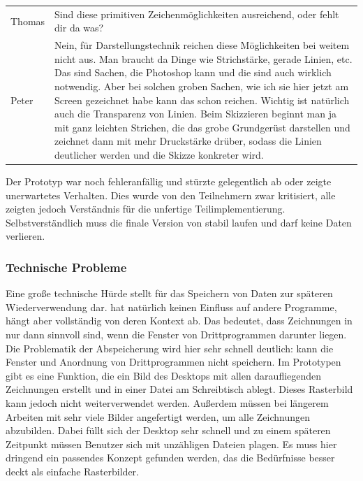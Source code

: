 \begin{extract}[Die Einsatzmöglichkeiten sind begrenzt.]
	{
		\myfloatalign
		\begin{tabularx}{\textwidth}{p{1.5cm}X}
			Thomas & Sind diese primitiven Zeichenmöglichkeiten ausreichend, oder fehlt dir da was?\\
			Peter & Nein, für Darstellungstechnik reichen diese Möglichkeiten bei weitem nicht aus. Man braucht da Dinge wie Strichstärke, gerade Linien, etc. Das sind Sachen, die Photoshop kann und die sind auch wirklich notwendig. Aber bei solchen groben Sachen, wie ich sie hier jetzt am Screen gezeichnet habe kann das schon reichen. Wichtig ist natürlich auch die Transparenz von Linien. Beim Skizzieren beginnt man ja mit ganz leichten Strichen, die das grobe Grundgerüst darstellen und zeichnet dann mit mehr Druckstärke drüber, sodass die Linien deutlicher werden und die Skizze konkreter wird.
		\end{tabularx}
	}
\end{extract}

Der Prototyp war noch fehleranfällig und stürzte gelegentlich ab oder zeigte unerwartetes Verhalten. Dies wurde von den Teilnehmern zwar kritisiert, alle zeigten jedoch Verständnis für die unfertige Teilimplementierung. Selbstverständlich muss die finale Version von \scribbler stabil laufen und darf keine Daten verlieren.


\subsubsection{Technische Probleme}
Eine große technische Hürde stellt für \scribbler das Speichern von Daten zur späteren Wiederverwendung dar. \scribbler hat natürlich keinen Einfluss auf andere Programme, hängt aber vollständig von deren Kontext ab. Das bedeutet, dass Zeichnungen in \scribbler nur dann sinnvoll sind, wenn die Fenster von Drittprogrammen darunter liegen. Die Problematik der Abspeicherung wird hier sehr schnell deutlich: \scribbler kann die Fenster und Anordnung von Drittprogrammen nicht speichern. Im Prototypen gibt es eine Funktion, die ein Bild des Desktops mit allen daraufliegenden Zeichnungen erstellt und in einer Datei am Schreibtisch ablegt. Dieses Rasterbild kann jedoch nicht weiterverwendet werden. Außerdem müssen bei längerem Arbeiten mit \scribbler sehr viele Bilder angefertigt werden, um alle Zeichnungen abzubilden. Dabei füllt sich der Desktop sehr schnell und zu einem späteren Zeitpunkt müssen Benutzer sich mit unzähligen Dateien plagen. Es muss hier dringend ein passendes Konzept gefunden werden, das die Bedürfnisse besser deckt als einfache Rasterbilder. 


